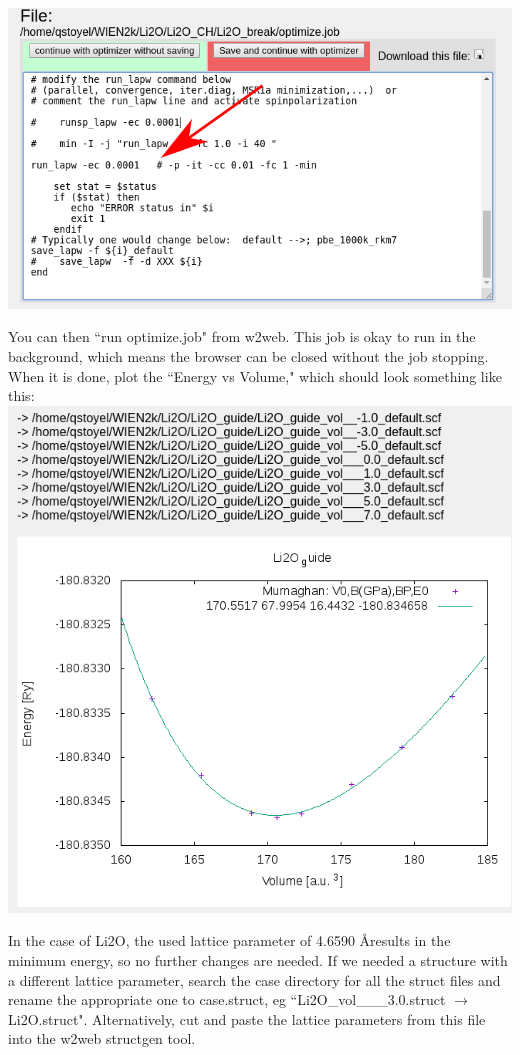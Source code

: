 \documentclass[12pt]{article}
\newcommand{\angstrom}{\mbox{\normalfont\AA }} %
\begin{document}
\includegraphics[scale=0.4]{./images/vol_opt2.png}

You can then ``run optimize.job" from w2web. This job is okay to run in the background, which means the browser can be closed without the job stopping.  When it is done, plot the ``Energy vs Volume," which should look something like this:\\
  
\includegraphics[scale=0.3]{./images/E_vs_V.png}

In the case of Li2O, the used lattice parameter of 4.6590 \angstrom results in the minimum energy, so no further changes are needed. If we needed a structure with a different lattice parameter, search the case directory for all the struct files and rename the appropriate one to case.struct, eg ``Li2O\_vol\_\_\_3.0.struct $\to$ Li2O.struct". Alternatively, cut and paste the lattice parameters from this file into the w2web structgen tool.    
\end{document}
